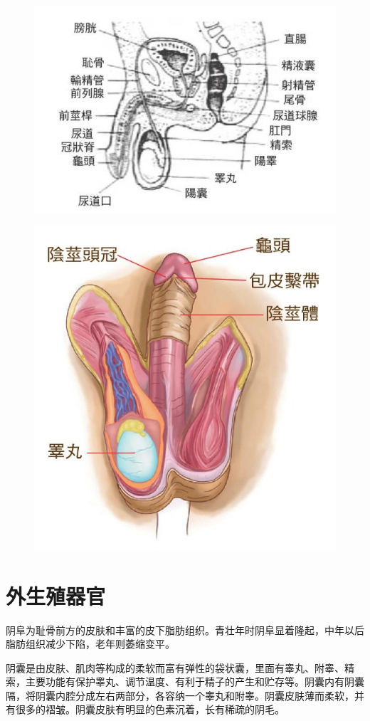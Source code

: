 \documentclass[12pt,UTF8]{ctexbook}
\begin{document}
\begin{figure}[H]
	\centering
	\includegraphics[width=0.7\linewidth]{4}
	\caption{}
\end{figure}

\begin{figure}[H]
	\centering
	\includegraphics[width=0.7\linewidth]{13}
	\caption{}
\end{figure}

\section{外生殖器官}

阴阜为耻骨前方的皮肤和丰富的皮下脂肪组织。青壮年时阴阜显着隆起，中年以后脂肪组织减少下陷，老年则萎缩变平。

阴囊是由皮肤、肌肉等构成的柔软而富有弹性的袋状囊，里面有睾丸、附睾、精索，主要功能有保护睾丸、调节温度、有利于精子的产生和贮存等。阴囊内有阴囊隔，将阴囊内腔分成左右两部分，各容纳一个睾丸和附睾。阴囊皮肤薄而柔软，并有很多的褶皱。阴囊皮肤有明显的色素沉着，长有稀疏的阴毛。
\end{document}
